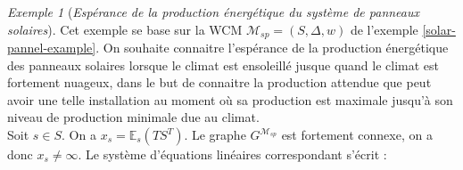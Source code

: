 \documentclass[12pt,a4paper]{report}
\theoremstyle{definition}%
\theoremstyle{remark}
\newtheorem{example}{Exemple}[chapter]
\begin{document}
\begin{example}[\textit{Espérance de la production énergétique du système de panneaux solaires}]
	Cet exemple se base sur la WCM $\mathcal{M}_{sp} = (S, \Delta, w)$ de l'exemple \ref{solar-pannel-example}. On souhaite connaitre l'espérance de la production énergétique des panneaux solaires lorsque le climat est ensoleillé jusque quand le climat est fortement nuageux, dans le but de connaitre la production attendue que peut avoir une telle installation au moment où sa production est maximale jusqu'à son niveau de production minimale due au climat.\\
	Soit $s \in S$. On a $x_s = \mathbb{E}_s(TS^T)$. Le graphe $G^{\mathcal{M}_{sp}}$ est fortement connexe, on a donc $x_s \neq \infty$. Le système d'équations linéaires correspondant s'écrit :


\end{example}
\end{document}
